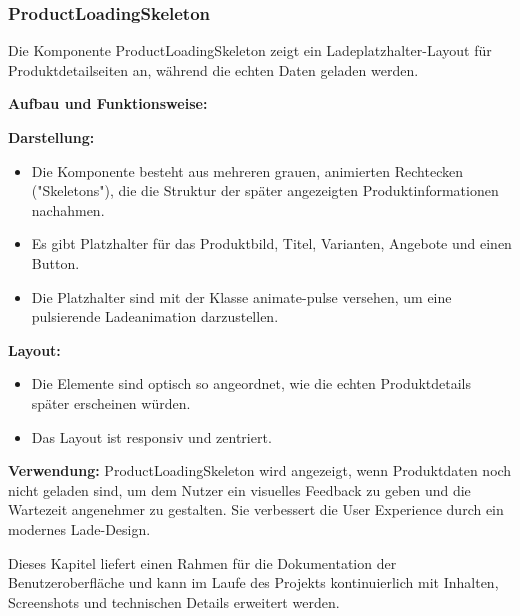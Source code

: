 \documentclass[12pt, a4paper]{report} %
\begin{document}
\subsubsection{ProductLoadingSkeleton}
Die Komponente ProductLoadingSkeleton zeigt ein Ladeplatzhalter-Layout für Produktdetailseiten an, während die echten Daten geladen werden.

\noindent\textbf{Aufbau und Funktionsweise:}

\textbf{Darstellung:}
\begin{itemize}
    \item Die Komponente besteht aus mehreren grauen, animierten Rechtecken ("Skeletons"), die die Struktur der später angezeigten Produktinformationen nachahmen.
    \item Es gibt Platzhalter für das Produktbild, Titel, Varianten, Angebote und einen Button.
    \item Die Platzhalter sind mit der Klasse animate-pulse versehen, um eine pulsierende Ladeanimation darzustellen.
\end{itemize}

\textbf{Layout:}
\begin{itemize}
    \item Die Elemente sind optisch so angeordnet, wie die echten Produktdetails später erscheinen würden.
    \item Das Layout ist responsiv und zentriert.
\end{itemize}

\noindent\textbf{Verwendung:} ProductLoadingSkeleton wird angezeigt, wenn Produktdaten noch nicht geladen sind, um dem Nutzer ein visuelles Feedback zu geben und die Wartezeit angenehmer zu gestalten. Sie verbessert die User Experience durch ein modernes Lade-Design.

\vspace{1em}
\noindent
Dieses Kapitel liefert einen Rahmen für die Dokumentation der Benutzeroberfläche und kann im Laufe des Projekts kontinuierlich mit Inhalten, Screenshots und technischen Details erweitert werden.
\end{document}
